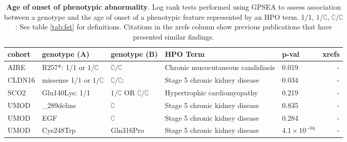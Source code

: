 \documentclass[12pt]{article}
\begin{document}
\begin{table}
\centering
\begin{tabular}{l>{\raggedright\arraybackslash}p{3.5cm}>{\raggedright\arraybackslash}p{2.5cm}>{\raggedright\arraybackslash}p{4cm}lr}
\toprule
\textbf{cohort} & \textbf{genotype (A)} & \textbf{genotype (B)} & \textbf{HPO Term} & \textbf{p-val} & \textbf{xrefs}\\
\midrule
AIRE & R257*: 1/1 or $1/\complement$ &  $\complement/\complement$ & Chronic mucocutaneous candidiasis & 0.019 & -\\
CLDN16 & missense 1/1 or $1/\complement$ & $\complement/\complement$: & Stage 5 chronic kidney disease & 0.034 & -\\
SCO2 & Glu140Lys: 1/1 &  $1/\complement$ OR $\complement/\complement$ & Hypertrophic cardiomyopathy & 0.219 & -\\
UMOD & 278\_289delins & $\complement$ & Stage 5 chronic kidney disease & 0.835 & -\\
UMOD & EGF & $\complement$ & Stage 5 chronic kidney disease & 0.284 & -\\
UMOD & Cys248Trp & Gln316Pro & Stage 5 chronic kidney disease & $4.1 \times 10^{-04}$ & -\\
\bottomrule
\end{tabular}
\caption{\textbf{Age of onset of phenotypic abnormality}. Log rank tests performed using GPSEA to assess association between a genotype and the 
age of onset of a phenotypic feature represented by an HPO term.  1/1, $1/\complement$, $\complement/\complement$: See table \ref{tab:fet} for definitions. Citations in the xrefs column show previous publications that have presented similar findings.}
\label{tab:hpo_onset}
\end{table}
\clearpage
\newpage
\end{document}

